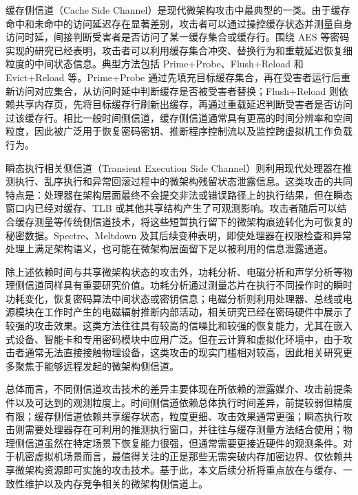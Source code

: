 缓存侧信道（Cache Side Channel）是现代微架构攻击中最典型的一类。由于缓存命中和未命中的访问延迟存在显著差别，攻击者可以通过操控缓存状态并测量自身访问时延，间接判断受害者是否访问了某一缓存集合或缓存行\cite{osvik2006cache,yarom2014flushreload}。围绕 AES 等密码实现的研究已经表明，攻击者可以利用缓存集合冲突、替换行为和重载延迟恢复细粒度的中间状态信息\cite{tromer2010efficient}。典型方法包括 Prime+Probe、Flush+Reload 和 Evict+Reload 等。Prime+Probe 通过先填充目标缓存集合，再在受害者运行后重新访问对应集合，从访问时延中判断缓存是否被受害者替换；Flush+Reload 则依赖共享内存页，先将目标缓存行刷新出缓存，再通过重载延迟判断受害者是否访问过该缓存行。相比一般时间侧信道，缓存侧信道通常具有更高的时间分辨率和空间粒度，因此被广泛用于恢复密码密钥、推断程序控制流以及监控跨虚拟机工作负载行为。

瞬态执行相关侧信道（Transient Execution Side Channel）则利用现代处理器在推测执行、乱序执行和异常回滚过程中的微架构残留状态泄露信息\cite{kocher2020spectre,lipp2018meltdown}。这类攻击的共同特点是：处理器在架构层面最终不会提交非法或错误路径上的执行结果，但在瞬态窗口内已经对缓存、TLB 或其他共享结构产生了可观测影响。攻击者随后可以结合缓存测量等传统侧信道技术，将这些短暂执行留下的微架构痕迹转化为可恢复的秘密数据。Spectre、Meltdown 及其后续变种表明，即使处理器在权限检查和异常处理上满足架构语义，也可能在微架构层面留下足以被利用的信息泄露通道。

除上述依赖时间与共享微架构状态的攻击外，功耗分析、电磁分析和声学分析等物理侧信道同样具有重要研究价值\cite{kocher1999differential,mangard2007power}。功耗分析通过测量芯片在执行不同操作时的瞬时功耗变化，恢复密码算法中间状态或密钥信息；电磁分析则利用处理器、总线或电源模块在工作时产生的电磁辐射推断内部活动，相关研究已经在密码硬件中展示了较强的攻击效果\cite{gandolfi2001electromagnetic}。这类方法往往具有较高的信噪比和较强的恢复能力，尤其在嵌入式设备、智能卡和专用密码模块中应用广泛。但在云计算和虚拟化环境中，由于攻击者通常无法直接接触物理设备，这类攻击的现实门槛相对较高，因此相关研究更多聚焦于能够远程发起的微架构侧信道。

总体而言，不同侧信道攻击技术的差异主要体现在所依赖的泄露媒介、攻击前提条件以及可达到的观测粒度上。时间侧信道依赖总体执行时间差异，前提较弱但精度有限；缓存侧信道依赖共享缓存状态，粒度更细、攻击效果通常更强；瞬态执行攻击则需要处理器存在可利用的推测执行窗口，并往往与缓存测量方法结合使用；物理侧信道虽然在特定场景下恢复能力很强，但通常需要更接近硬件的观测条件。对于机密虚拟机场景而言，最值得关注的正是那些无需突破内存加密边界、仅依赖共享微架构资源即可实施的攻击技术。基于此，本文后续分析将重点放在与缓存、一致性维护以及内存竞争相关的微架构侧信道上。

